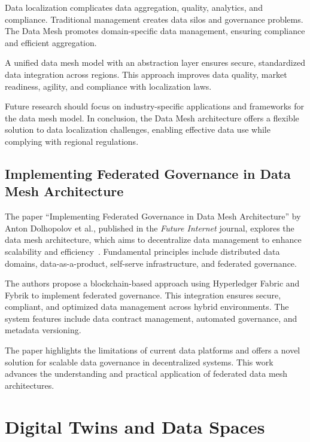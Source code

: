 Data localization complicates data aggregation, quality, analytics, and compliance.
Traditional management creates data silos and governance problems.
The Data Mesh promotes domain-specific data management, ensuring compliance and efficient aggregation.

A unified data mesh model with an abstraction layer ensures secure, standardized data integration across regions.
This approach improves data quality, market readiness, agility, and compliance with localization laws.

Future research should focus on industry-specific applications and frameworks for the data mesh model.
In conclusion, the Data Mesh architecture offers a flexible solution to data localization challenges, enabling effective data use while complying with regional regulations.

\subsection{Implementing Federated Governance in Data Mesh Architecture}\label{subsec:implementing-federated-governance-in-data-mesh-architecture}

The paper ``Implementing Federated Governance in Data Mesh Architecture'' by Anton Dolhopolov et al., published in the \textit{Future Internet} journal, explores the data mesh architecture, which aims to decentralize data management to enhance scalability and efficiency~\cite{implementing_federated_governance}.
Fundamental principles include distributed data domains, data-as-a-product, self-serve infrastructure, and federated governance.

The authors propose a blockchain-based approach using Hyperledger Fabric and Fybrik to implement federated governance.
This integration ensures secure, compliant, and optimized data management across hybrid environments.
The system features include data contract management, automated governance, and metadata versioning.

The paper highlights the limitations of current data platforms and offers a novel solution for scalable data governance in decentralized systems.
This work advances the understanding and practical application of federated data mesh architectures.

\section{Digital Twins and Data Spaces}\label{sec:digital-twins-and-data-spaces}


